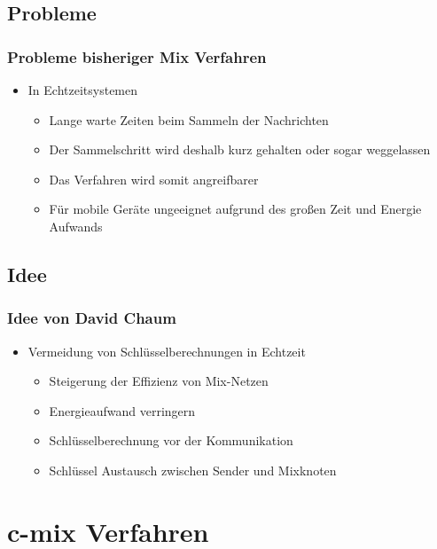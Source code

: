 \documentclass[t, xcolor=dvipsnames]{beamer}
\begin{document}
\subsection{Probleme} %
\begin{frame}
	\frametitle{Probleme bisheriger Mix Verfahren}
	\begin{itemize}
		\item In Echtzeitsystemen
			\begin{itemize}
				\item Lange warte Zeiten beim Sammeln der Nachrichten
				\item Der Sammelschritt wird deshalb kurz gehalten oder sogar weggelassen
				\item Das Verfahren wird somit angreifbarer
				\item Für mobile Geräte ungeeignet aufgrund des großen Zeit und Energie Aufwands
			\end{itemize}
	\end{itemize}
	\vspace{\fill}
\end{frame}
\subsection{Idee} %
\begin{frame}
	\frametitle{Idee von David Chaum}
	\begin{itemize}
		\item Vermeidung von Schlüsselberechnungen in Echtzeit 
			\begin{itemize}
				\item Steigerung der Effizienz von Mix-Netzen
				\item Energieaufwand verringern
				\item Schlüsselberechnung vor der Kommunikation
				\item Schlüssel Austausch zwischen Sender und Mixknoten
			\end{itemize}
	\end{itemize}
	\vspace{\fill}
\end{frame}


\section{c-mix Verfahren} %
\end{document}
